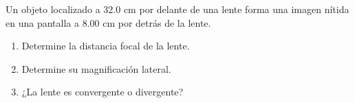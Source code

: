 \item Un objeto localizado a $32.0\text{ cm}$ por delante de una lente forma una imagen nítida en una pantalla a $8.00\text{ cm}$ por detrás de la lente.
\begin{enumerate}
    \item Determine la distancia focal de la lente.
    \item Determine su magnificación lateral.
    \item ¿La lente es convergente o divergente?
\end{enumerate}